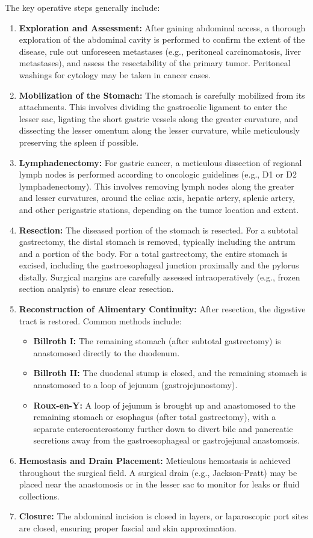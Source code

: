 The key operative steps generally include:
\begin{enumerate}
  \item \textbf{Exploration and Assessment:} After gaining abdominal access, a thorough exploration of the abdominal cavity is performed to confirm the extent of the disease, rule out unforeseen metastases (e.g., peritoneal carcinomatosis, liver metastases), and assess the resectability of the primary tumor. Peritoneal washings for cytology may be taken in cancer cases.
  \item \textbf{Mobilization of the Stomach:} The stomach is carefully mobilized from its attachments. This involves dividing the gastrocolic ligament to enter the lesser sac, ligating the short gastric vessels along the greater curvature, and dissecting the lesser omentum along the lesser curvature, while meticulously preserving the spleen if possible.
  \item \textbf{Lymphadenectomy:} For gastric cancer, a meticulous dissection of regional lymph nodes is performed according to oncologic guidelines (e.g., D1 or D2 lymphadenectomy). This involves removing lymph nodes along the greater and lesser curvatures, around the celiac axis, hepatic artery, splenic artery, and other perigastric stations, depending on the tumor location and extent.
  \item \textbf{Resection:} The diseased portion of the stomach is resected. For a subtotal gastrectomy, the distal stomach is removed, typically including the antrum and a portion of the body. For a total gastrectomy, the entire stomach is excised, including the gastroesophageal junction proximally and the pylorus distally. Surgical margins are carefully assessed intraoperatively (e.g., frozen section analysis) to ensure clear resection.
  \item \textbf{Reconstruction of Alimentary Continuity:} After resection, the digestive tract is restored. Common methods include:
    \begin{itemize}
      \item \textbf{Billroth I:} The remaining stomach (after subtotal gastrectomy) is anastomosed directly to the duodenum.
      \item \textbf{Billroth II:} The duodenal stump is closed, and the remaining stomach is anastomosed to a loop of jejunum (gastrojejunostomy).
      \item \textbf{Roux-en-Y:} A loop of jejunum is brought up and anastomosed to the remaining stomach or esophagus (after total gastrectomy), with a separate enteroenterostomy further down to divert bile and pancreatic secretions away from the gastroesophageal or gastrojejunal anastomosis.
    \end{itemize}
  \item \textbf{Hemostasis and Drain Placement:} Meticulous hemostasis is achieved throughout the surgical field. A surgical drain (e.g., Jackson-Pratt) may be placed near the anastomosis or in the lesser sac to monitor for leaks or fluid collections.
  \item \textbf{Closure:} The abdominal incision is closed in layers, or laparoscopic port sites are closed, ensuring proper fascial and skin approximation.
\end{enumerate}

